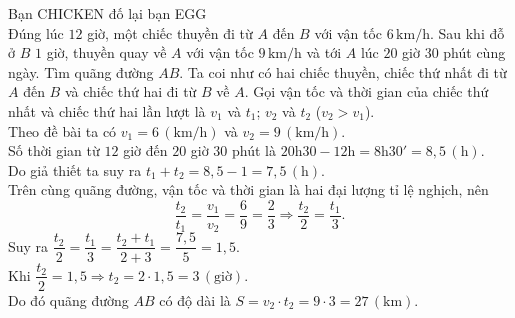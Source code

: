 \begin{bt}%
Bạn CHICKEN đố lại bạn EGG\\
Đúng lúc $12$ giờ, một chiếc thuyền đi  từ $A$ đến $B$ với vận tốc $6\, \mathrm{km}/\mathrm{h}$. Sau khi đỗ ở $B$ $1$ giờ, thuyền quay về $A$ với vận tốc $9\, \mathrm{km}/\mathrm{h}$ và tới $A$ lúc $20$ giờ $30$ phút cùng ngày. Tìm quãng đường $AB$.
	\loigiai
	{Ta coi như có hai chiếc thuyền, chiếc thứ nhất đi từ $A$ đến $B$ và chiếc thứ hai đi từ $B$ về $A$. Gọi vận tốc và thời gian của chiếc thứ nhất và chiếc thứ hai lần lượt là $v_{1}$ và $t_{1}$; $v_{2}$ và $t_{2}$ ($v_{2} > v_{1}$).\\
		Theo đề bài ta có  $v_{1} = 6\, \left(\mathrm{km}/\mathrm{h}\right)$ và $v_{2} = 9\, \left(\mathrm{km}/\mathrm{h}\right)$.\\
		Số thời gian từ $12$ giờ đến $20$ giờ $30$ phút là $20\mathrm{h}30 - 12\mathrm{h} = 8\mathrm{h}30' = 8{,}5\, \left(\mathrm{h}\right)$.\\
		Do giả thiết ta suy ra $t_{1} + t_{2} = 8{,}5 - 1 = 7{,}5\, \left(\mathrm{h}\right)$.\\
		Trên cùng quãng đường, vận tốc và thời gian là hai đại lượng tỉ lệ nghịch, nên 
		$$\dfrac{t_{2}}{t_{1}} =  \dfrac{v_{1}}{v_{2}}  = \dfrac{6}{9} = \dfrac{2}{3}\Rightarrow \dfrac{t_{2}}{2} = \dfrac{t_{1}}{3}.$$  
		Suy ra 	$\dfrac{t_{2}}{2} = \dfrac{t_{1}}{3} = \dfrac{t_{2} + t_{1}}{2 + 3} = \dfrac{7{,}5}{5} = 1{,}5$.\\
	    Khi $\dfrac{t_{2}}{2} = 1{,}5 \Rightarrow t_{2} = 2\cdot 1{,}5 = 3\, \left(\text{giờ}\right)$.\\
		Do đó quãng đường $AB$ có độ dài là $S = v_{2}\cdot t_{2} = 9\cdot 3 = 27\, \left(\mathrm{km}\right)$.
	}		
\end{bt}

